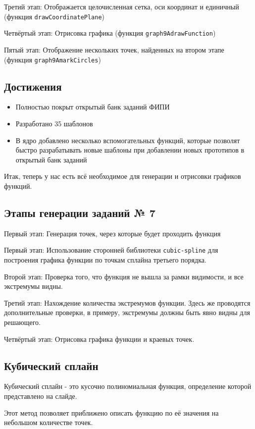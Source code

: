 \documentclass[a4paper, 12pt]{extarticle}
\begin{document}
Третий этап: Отображается целочисленная сетка, оси координат и единичный  (функция \texttt{drawCoordinatePlane})

Четвёртый этап: Отрисовка графика (функция \texttt{graph9AdrawFunction})

Пятый этап: Отображение нескольких точек, найденных на втором этапе (функция \texttt{graph9AmarkCircles})
\newpage
\subsection*{Достижения}
\begin{itemize}
    \item Полностью покрыт открытый банк заданий ФИПИ
    \item Разработано 35 шаблонов
    \item В ядро добавлено несколько вспомогательных функций, которые позволят быстро разрабатывать новые шаблоны при добавлении новых прототипов в открытый банк заданий
\end{itemize}

Итак, теперь у нас есть всё необходимое для генерации и отрисовки графиков функций.

\subsection*{Этапы генерации заданий № 7}
    Первый этап: Генерация точек, через которые будет проходить функция
        
    Первый этап: Использование сторонней библиотеки \texttt{cubic-spline} для построения графика функции по точкам сплайна третьего порядка.
        
    Второй этап: Проверка того, что функция не вышла за рамки видимости, и все экстремумы видны. %
    
    Третий этап: Нахождение количества экстремумов функции.
    Здесь же проводятся дополнительные проверки, в примеру, экстремумы должны быть явно видны для решающего. 
        
    Четвёртый этап: Отрисовка графика функции и краевых точек.
    
\subsection*{Кубический сплайн}

Кубический сплайн - это кусочно полиномиальная функция, определение которой представлено на слайде.

Этот метод позволяет приближено описать функцию по её значения на небольшом количестве точек.
\end{document}
